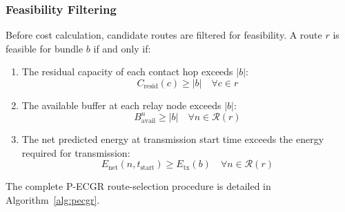\documentclass[a4paper,fleqn]{cas-dc}
\newcommand{\pecgr}{\textsf{P-ECGR}}
\begin{document}
\subsubsection{Feasibility Filtering}
Before cost calculation, candidate routes are filtered for feasibility. A route $r$ is feasible for bundle $b$ if and only if:
\begin{enumerate}
    \item The residual capacity of each contact hop exceeds $|b|$:
    \begin{equation}
        C_{\text{resid}}(c) \geq |b| \quad \forall c \in r
    \end{equation}
    \item The available buffer at each relay node exceeds $|b|$:
    \begin{equation}
        B_{\text{avail}}^n \geq |b| \quad \forall n \in \mathcal{R}(r)
    \end{equation}
    \item The net predicted energy at transmission start time exceeds the energy required for transmission:
    \begin{equation}
        E_{\text{net}}(n, t_{\text{start}}) \geq E_{\text{tx}}(b) \quad \forall n \in \mathcal{R}(r)
    \end{equation}
\end{enumerate}

The complete \pecgr{} route-selection procedure is detailed in Algorithm~\ref{alg:pecgr}.
\end{document}

